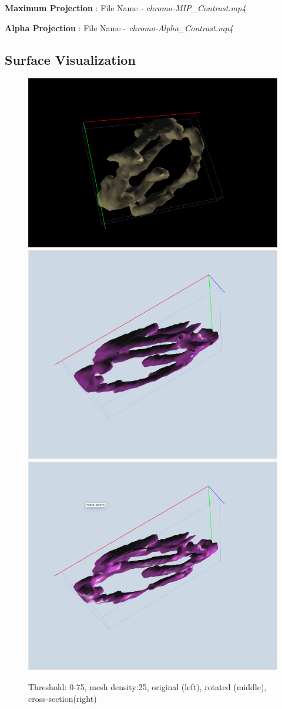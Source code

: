 \documentclass{article}
\begin{document}
\medskip

\textbf{Maximum Projection} : File Name - \textit{chromo-MIP\_Contrast.mp4}

\textbf{Alpha Projection} : File Name - \textit{chromo-Alpha\_Contrast.mp4}
\subsection*{Surface Visualization}

\begin{figure}
    \centering
    \includegraphics[width=0.3\linewidth]{Report/Images/6.3.2/0-75,25.png}
    \includegraphics[width=0.3\linewidth]{Report/Images/6.3.2/0-75,25-rotated.png}
    \includegraphics[width=0.3\linewidth]{Report/Images/6.3.2/0-75,25-sliced.png}
    \caption{Threshold: 0-75, mesh density:25, original (left), rotated (middle), cross-section(right)}
    \label{fig:enter-label}
\end{figure}
\end{document}
